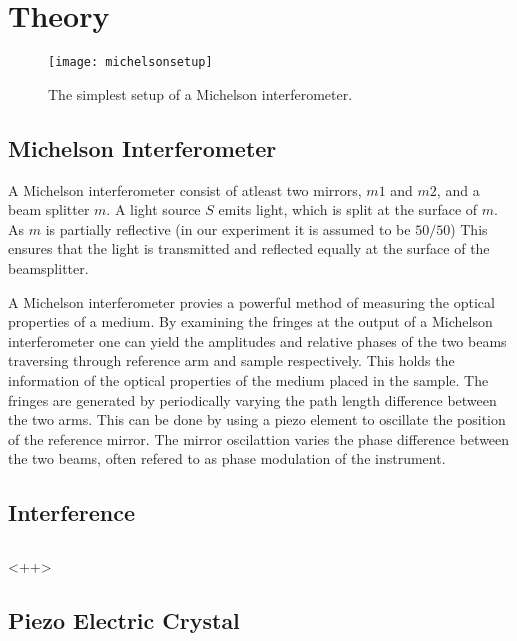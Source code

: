 \section{Theory}
\begin{figure*}
    \centering
    \texttt{[image: michelsonsetup]}
    \caption{The simplest setup of a Michelson interferometer.}
    \label{fig:configuration}
\end{figure*}
\subsection{Michelson Interferometer}
A Michelson interferometer consist of atleast two mirrors, $m1$ and $m2$, and a beam splitter $m$. A light source $S$ emits light, which is split at the surface of $m$. As $m$ is partially reflective (in our experiment it is assumed to be $50/50$) This ensures that the light is transmitted and reflected equally at the surface of the beamsplitter.

A Michelson interferometer provies a powerful method of measuring the optical properties of a medium. By examining the fringes at the output of a Michelson interferometer one can yield the amplitudes and relative phases of the two beams traversing through reference arm and sample respectively. This holds the information of the optical properties of the medium placed in the sample. The fringes are generated by periodically varying the path length difference between the two arms. This can be done by using a piezo element to oscillate the position of the reference mirror. The mirror oscilattion varies the phase difference between the two beams, often refered to as phase modulation of the instrument.
\subsection{Interference}
\subsection{}<++>

\subsection{Piezo Electric Crystal}


